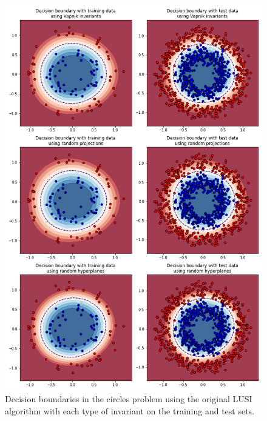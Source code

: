 \begin{figure}[H]
    \centering
    \includegraphics[width=\textwidth]{thesis/Figures/circles_decision_boundaries.png}
    \caption{Decision boundaries in the circles problem using the original LUSI algorithm with each type of
    invariant on the training and test sets.}
    \label{fig:circles_decision_boundary}
\end{figure}

